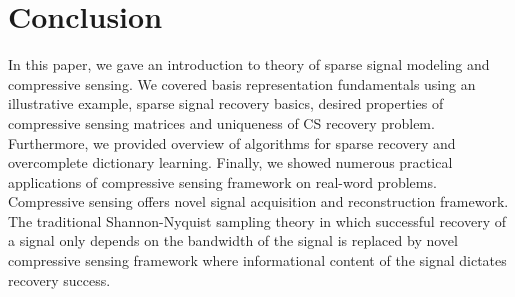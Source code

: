\documentclass[journal]{IEEEtran}
\begin{document}
%




\section{Conclusion} \label{sec:7}

In this paper, we gave an introduction to theory of sparse signal modeling and compressive sensing. We covered basis representation fundamentals using an illustrative example, sparse signal recovery basics, desired properties of compressive sensing matrices and uniqueness of CS recovery problem. Furthermore, we provided overview of algorithms for sparse recovery and overcomplete dictionary learning. Finally, we showed numerous practical applications of compressive sensing framework on real-word problems. Compressive sensing offers novel signal acquisition and reconstruction framework. The traditional Shannon-Nyquist sampling theory in which successful recovery of a signal only depends on the bandwidth of the signal is replaced by novel compressive sensing framework where informational content of the signal dictates recovery success.
\end{document}
